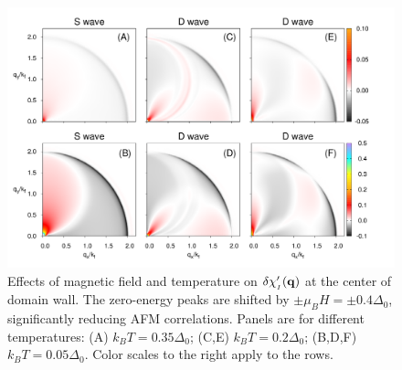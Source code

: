 \documentclass[prb,aps,showpacs,amsmath,twocolumn,10pt]{revtex4-1}
\newcommand{\blue}{\textcolor{blue}}
\newcommand{\red}{\textcolor{red}}
\begin{document}
\begin{figure}
\includegraphics[scale=0.1]{./Fig3}
\caption{\label{fig:sus_TB}
\quad Effects of magnetic field and temperature on  $\delta\chi'_{{}_I}({\bf q})$ at the center of domain wall. 
The zero-energy peaks are shifted by $\pm\mu_BH = \pm0.4\Delta_0$, significantly reducing 
AFM correlations. 
Panels are for different temperatures: 
(A) $k_B T = 0.35\Delta_0$;  
(C,E) $k_B T = 0.2\Delta_0$; 
(B,D,F) $k_B T = 0.05\Delta_0$. Color scales to the right apply to the rows.
} 
\end{figure}
\end{document}

